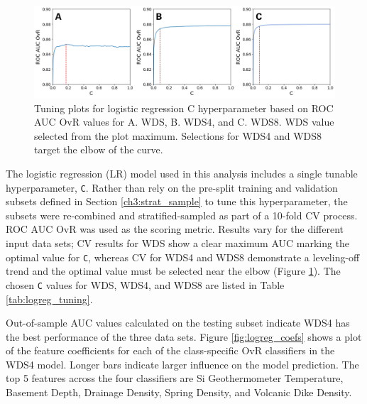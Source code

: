 \begin{figure}[!htp]
\centering
\includegraphics[width=\textwidth]{templates/images/Figure-LR_C_tuning.png}
\singlespacing
\caption[Logistic regression hyperparameter tuning]{Tuning plots for logistic regression C hyperparameter based on ROC AUC OvR values for A. WDS,  B. WDS4, and C. WDS8. WDS value selected from the plot maximum. Selections for WDS4 and WDS8 target the elbow of the curve.}
\label{fig:logreg_hp_tuning}
\end{figure}

The logistic regression (LR) model used in this analysis \citep{pedregosa_scikit-learn_2011} includes a single tunable hyperparameter, \verb|C|. Rather than rely on the pre-split training and validation subsets defined in Section \ref{ch3:strat_sample} to tune this hyperparameter, the subsets were re-combined and stratified-sampled as part of a 10-fold CV process. ROC AUC OvR was used as the scoring metric. Results vary for the different input data sets; CV results for WDS show a clear maximum AUC marking the optimal value for \verb|C|, whereas CV for WDS4 and WDS8 demonstrate a leveling-off trend and the optimal value must be selected near the elbow (Figure \ref{fig:logreg_hp_tuning}). The chosen \verb|C| values for WDS, WDS4, and WDS8 are listed in Table \ref{tab:logreg_tuning}.

Out-of-sample AUC values calculated on the testing subset indicate WDS4 has the best performance of the three data sets. Figure \ref{fig:logreg_coefs} shows a plot of the feature coefficients for each of the class-specific OvR classifiers in the WDS4 model. Longer bars indicate larger influence on the model prediction. The top 5 features across the four classifiers are Si Geothermometer Temperature, Basement Depth, Drainage Density, Spring Density, and Volcanic Dike Density.

